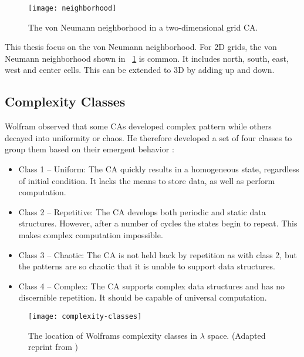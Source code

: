 \begin{figure}[!ht]
    \centering
    \texttt{[image: neighborhood]}
    \caption[Neighborhood]{
        The von Neumann neighborhood in a two-dimensional grid CA.
    }
    \label{fig:neighborhood}
\end{figure}

This thesis focus on the von Neumann neighborhood.
For 2D grids, the von Neumann neighborhood shown in \figurename~\ref{fig:neighborhood} is common.
It includes north, south, east, west and center cells.
This can be extended to 3D by adding up and down.

\subsection{Complexity Classes}

Wolfram observed that some CAs developed complex pattern while others decayed into uniformity or chaos.
He therefore developed a set of four classes to group them based on their emergent behavior \cite{wolfram1984complexity}:

\begin{itemize}
    \item Class 1 – Uniform:
        The CA quickly results in a homogeneous state, regardless of initial condition.
        It lacks the means to store data, as well as perform computation.
    \item Class 2 – Repetitive:
        The CA develops both periodic and static data structures.
        However, after a number of cycles the states begin to repeat.
        This makes complex computation impossible.
    \item Class 3 – Chaotic:
        The CA is not held back by repetition as with class 2, but the patterns are so chaotic that it is unable to support data structures.
    \item Class 4 – Complex:
        The CA supports complex data structures and has no discernible repetition.
        It should be capable of universal computation.
\end{itemize}

\begin{figure}[!ht]
    \centering
    \texttt{[image: complexity-classes]}
    \caption[Complexity classes]{
        The location of Wolframs complexity classes in $\lambda$ space.
        (Adapted reprint from \cite{langton1990edgeofchaos})
    }
    \label{fig:complexity-classes}
\end{figure}

